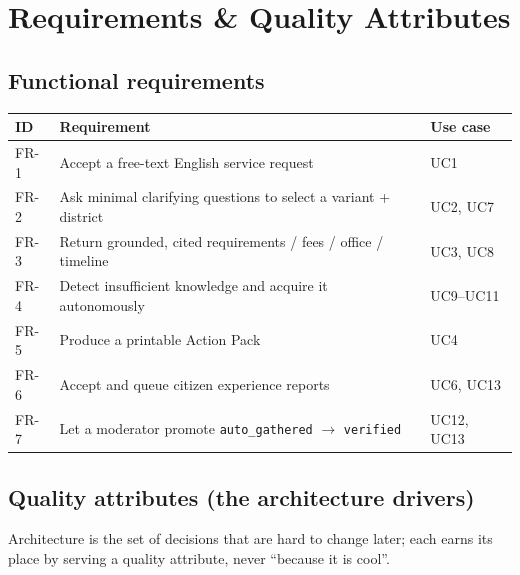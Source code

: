 \documentclass[11pt,a4paper]{article}
\begin{document}
\section{Requirements \& Quality Attributes}
\label{sec:requirements}

\subsection{Functional requirements}
\begin{center}
\begin{tabularx}{\linewidth}{@{}l Y l@{}}
\toprule
\textbf{ID} & \textbf{Requirement} & \textbf{Use case} \\
\midrule
FR-1 & Accept a free-text English service request & UC1 \\
FR-2 & Ask minimal clarifying questions to select a variant + district & UC2, UC7 \\
FR-3 & Return grounded, cited requirements / fees / office / timeline & UC3, UC8 \\
FR-4 & Detect insufficient knowledge and acquire it autonomously & UC9--UC11 \\
FR-5 & Produce a printable Action Pack & UC4 \\
FR-6 & Accept and queue citizen experience reports & UC6, UC13 \\
FR-7 & Let a moderator promote \texttt{auto\_gathered} $\to$ \texttt{verified} & UC12, UC13 \\
\bottomrule
\end{tabularx}
\end{center}

\subsection{Quality attributes (the architecture drivers)}
Architecture is the set of decisions that are hard to change later; each earns its place by serving
a quality attribute, never ``because it is cool''.
\end{document}
